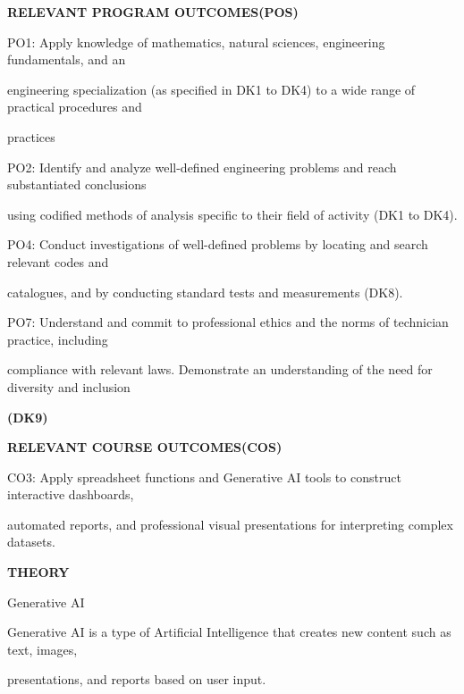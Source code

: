 \documentclass[10pt,a4paper]{article}
\begin{document}
\medskip\noindent\textbf{RELEVANT PROGRAM OUTCOMES(POS)}\par
\noindent PO1: Apply knowledge of mathematics, natural sciences, engineering fundamentals, and an\par
\noindent engineering specialization (as specified in DK1 to DK4) to a wide range of practical procedures and\par
\noindent practices\par
\noindent PO2: Identify and analyze well-defined engineering problems and reach substantiated conclusions\par
\noindent using codified methods of analysis specific to their field of activity (DK1 to DK4).\par
\noindent PO4: Conduct investigations of well-defined problems by locating and search relevant codes and\par
\noindent catalogues, and by conducting standard tests and measurements (DK8).\par
\noindent PO7: Understand and commit to professional ethics and the norms of technician practice, including\par
\noindent compliance with relevant laws. Demonstrate an understanding of the need for diversity and inclusion\par
\medskip\noindent\textbf{(DK9)}\par

\medskip\noindent\textbf{RELEVANT COURSE OUTCOMES(COS)}\par
\noindent CO3: Apply spreadsheet functions and Generative AI tools to construct interactive dashboards,\par
\noindent automated reports, and professional visual presentations for interpreting complex datasets.\par

\medskip\noindent\textbf{THEORY}\par
\noindent Generative AI\par
\noindent Generative AI is a type of Artificial Intelligence that creates new content such as text, images,\par
\noindent presentations, and reports based on user input.\par
\end{document}
